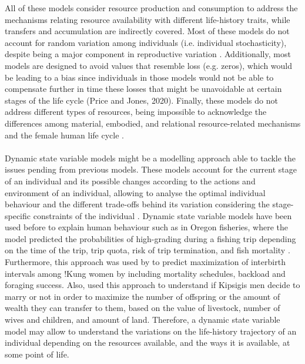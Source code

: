 \documentclass{article}
\begin{document}
All of these models consider resource production and consumption to address the mechanisms relating resource availability with different life-history traits, while transfers and accumulation are indirectly covered. Most of these models do not account for random variation among individuals (i.e. individual stochasticity), despite being a major component in reproductive variation \citep{van2017lifetime}. Additionally, most models are designed to avoid values that resemble loss (e.g. zeros), which would be leading to a bias since individuals in those models would not be able to compensate further in time these losses that might be unavoidable at certain stages of the life cycle (Price and Jones, 2020). Finally, these models do not address different types of resources, being impossible to acknowledge the differences among material, embodied, and relational resource-related mechanisms and the female human life cycle \citep{mulder2009intergenerational}.
\\\\
Dynamic state variable models might be a modelling approach able to tackle the issues pending from previous models. These models account for the current stage of an individual and its possible changes according to the actions and environment of an individual, allowing to analyse the optimal individual behaviour and the different trade-offs behind its variation considering the stage-specific constraints of the individual \citep{houston1988dynamic,clark2000dynamic}. Dynamic state variable models have been used before to explain human behaviour such as in Oregon fisheries, where the model predicted the probabilities of high-grading during a fishing trip depending on the time of the trip, trip quota, risk of trip termination, and fish mortality \citep{gillis1995dynamic}. Furthermore, this approach was used by \cite{anderies1996adaptive} to predict maximization of interbirth intervals among !Kung women by including mortality schedules, backload and foraging success. Also, \cite{luttbeg2000marry} used this approach to understand if Kipsigis men decide to marry or not in order to maximize the number of offspring or the amount of wealth they can transfer to them, based on the value of livestock, number of wives and children, and amount of land. Therefore, a dynamic state variable model may allow to understand the variations on the life-history trajectory of an individual depending on the resources available, and the ways it is available, at some point of life.
\\\\
\end{document}
